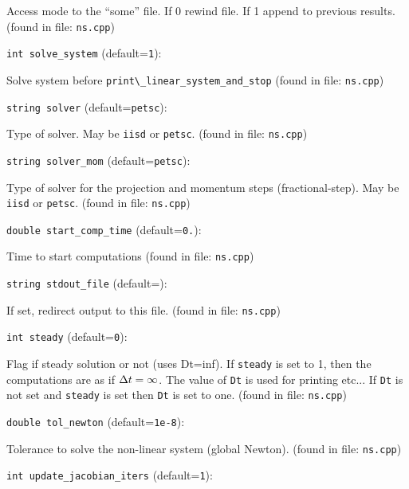 Access mode to the ``some'' file. If 0 rewind file. If 1 
 append to previous  results.
 (found in file: \verb+ns.cpp+)
\item\verb+int solve_system+ {\rm(default=\verb|1|)}:

Solve system before \verb+print\_linear_system_and_stop+
 (found in file: \verb+ns.cpp+)
\item\verb+string solver+ {\rm(default=\verb|petsc|)}:

Type of solver. May be \verb+iisd+ or \verb+petsc+. 
 (found in file: \verb+ns.cpp+)
\item\verb+string solver_mom+ {\rm(default=\verb|petsc|)}:

Type of solver for the projection and momentum steps
(fractional-step). May be \verb+iisd+ or \verb+petsc+.
 (found in file: \verb+ns.cpp+)
\item\verb+double start_comp_time+ {\rm(default=\verb|0.|)}:

Time to start computations
 (found in file: \verb+ns.cpp+)
\item\verb+string stdout_file+ {\rm(default=\verb||)}:

If set, redirect output to this file.
 (found in file: \verb+ns.cpp+)
\item\verb+int steady+ {\rm(default=\verb|0|)}:

Flag if steady solution or not (uses Dt=inf). If \verb+steady+
is set to 1, then the computations are as if ${\Delta t}=\infty$. 
The value of \verb+Dt+ is used for printing etc... If \verb+Dt+
is not set and \verb+steady+ is set then \verb+Dt+ is set to one.
 (found in file: \verb+ns.cpp+)
\item\verb+double tol_newton+ {\rm(default=\verb|1e-8|)}:

Tolerance to solve the non-linear system (global Newton).
 (found in file: \verb+ns.cpp+)
\item\verb+int update_jacobian_iters+ {\rm(default=\verb|1|)}:

